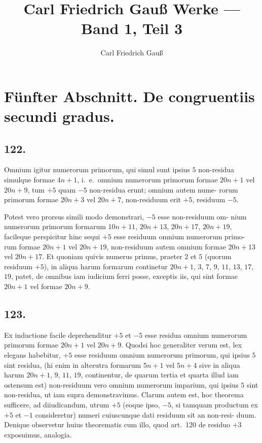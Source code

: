 \documentclass[12pt,a4paper]{article}
\title{Carl Friedrich Gau\ss{} Werke --- Band 1, Teil 3}
\author{Carl Friedrich Gau\ss{}}
\date{}
\theoremstyle{plain}
\theoremstyle{definition}
\theoremstyle{remark}
\begin{document}
\maketitle

\section*{F\"unfter Abschnitt. De congruentiis secundi gradus.}


\subsection*{122.}

Omnium igitur numerorum primorum, qui simul sunt ipsius $5$ non-residua
simulque formae $4n+1$, i.~e.\ omnium numerorum primorum formae $20n+1$
vel $20n+9$, tum $+5$ quam $-5$ non-residua erunt; omnium autem nume-
rorum primorum formae $20n+3$ vel $20n+7$, non-residuum erit $+5$,
residuum $-5$.

Potest vero prorsus simili modo demonstrari, $-5$ esse non-residuum om-
nium numerorum primorum formarum $10n+11$, $20n+13$, $20n+17$, $20n+19$,
facileque perspicitur hinc sequi $+5$ esse residuum omnium numerorum primo-
rum formae $20n+1$ vel $20n+19$, non-residuum autem omnium formae
$20n+13$ vel $20n+17$. Et quoniam quivis numerus primus, praeter $2$ et $5$
(quorum residuum $+5$), in aliqua harum formarum continetur $20n+1$, $3$, $7$, $9$,
$11$, $13$, $17$, $19$, patet, de omnibus iam iudicium ferri posse, exceptis iis, qui sint
formae $20n+1$ vel formae $20n+9$.

\subsection*{123.}

Ex inductione facile deprehenditur $+5$ et $-5$ esse residua omnium
numerorum primorum formae $20n+1$ vel $20n+9$. Quodsi hoc generaliter
verum est, lex elegans habebitur, $+5$ esse residuum omnium numerorum primorum,
qui ipsius $5$ sint residua, (hi enim in alterutra formarum $5n+1$ vel $5n+4$ sive
in aliqua harum $20n+1$, $9$, $11$, $19$, continentur, de quarum tertia et quarta
illud iam ostensum est) non-residuum vero omnium numerorum imparium, qui ipsius $5$
sint non-residua, ut iam supra demonstravimus. Clarum autem est, hoc theorema
sufficere, ad diiudicandum, utrum $+5$ (eoque ipso, $-5$, si tamquam productum
ex $+5$ et $-1$ consideretur) numeri cuiuscunque dati residuum sit an non-resi-
duum. Denique observetur huius theorematis cum illo, quod art.~120 de residuo
$+3$ exposuimus, analogia.
\end{document}
